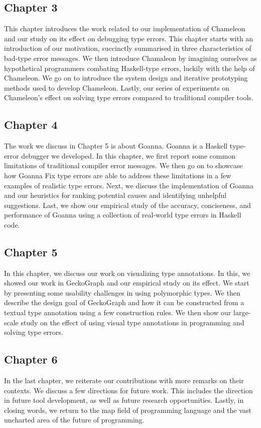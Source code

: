\subsection{Chapter 3}
This chapter introduces the work related to our implementation of Chameleon and our study on its effect on debugging type errors. This chapter starts with an introduction of our motivation, succinctly summarised in three characteristics of bad-type error messages. We then introduce Chamaleon by imagining ourselves as hypothetical programmers combating Haskell-type errors, luckily with the help of Chameleon. We go on to introduce the system design and iterative prototyping methods used to develop Chameleon. Lastly, our series of experiments on Chameleon's effect on solving type errors compared to traditional compiler tools. 


\subsection{Chapter 4}

The work we discuss in Chapter 5 is about Goanna. Goanna is a Haskell type-error debugger we developed. In this chapter, we first report some common limitations of traditional compiler error messages. We then go on to showcase how Goanna Fix type errors are able to address these limitations in a few examples of realistic type errors.  Next, we discuss the implementation of Goanna and our heuristics for ranking potential causes and identifying unhelpful suggestions. Last, we show our empirical study of the accuracy, conciseness, and performance of Goanna using a collection of real-world type errors in Haskell code. 

\subsection{Chapter 5}

In this chapter, we discuss our work on visualizing type annotations. In this, we showed our work in GeckoGraph and our empirical study on its effect. We start by presenting some usability challenges in using polymorphic types. We then describe the design goal of GeckoGraph and how it can be constructed from a textual type annotation using a few construction rules. We then show our large-scale study on the effect of using visual type annotations in programming and solving type errors. 


\subsection{Chapter 6}

In the last chapter, we reiterate our contributions with more remarks on their contexts. We discuss a few directions for future work. This includes the direction in future tool development, as well as future research opportunities. Lastly, in closing words, we return to the map field of programming language and the vast uncharted area of the future of programming. 